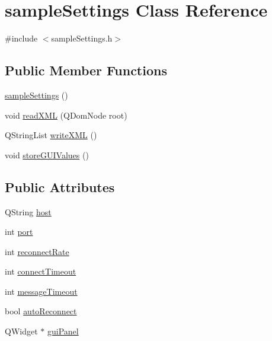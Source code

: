 \hypertarget{classsample_settings}{\section{sample\+Settings Class Reference}
\label{classsample_settings}
}


{\ttfamily \#include $<$sample\+Settings.\+h$>$}

\subsection*{Public Member Functions}
\begin{DoxyCompactItemize}
\item 
\hyperlink{classsample_settings_a3ae7a15cc1b8cf55d57139a0976f9dfd}{sample\+Settings} ()
\item 
void \hyperlink{classsample_settings_a2ab1eb40b65cddcad17c556f43fa2667}{read\+X\+M\+L} (Q\+Dom\+Node root)
\item 
Q\+String\+List \hyperlink{classsample_settings_a0996a76fb953ad9f5b7464cb328e60a4}{write\+X\+M\+L} ()
\item 
void \hyperlink{classsample_settings_ae87dbb0454d5dd59ba666fecf149cac7}{store\+G\+U\+I\+Values} ()
\end{DoxyCompactItemize}
\subsection*{Public Attributes}
\begin{DoxyCompactItemize}
\item 
Q\+String \hyperlink{classsample_settings_a1936cbf3ca632352dc75c1ecc30d9ec4}{host}
\item 
int \hyperlink{classsample_settings_a174a34a6ac173e8ded1b1496526a207e}{port}
\item 
int \hyperlink{classsample_settings_aa10ab5fff05664b7249873cea20c8164}{reconnect\+Rate}
\item 
int \hyperlink{classsample_settings_a4ea02c94b4f50acfefc8d9d8bea23868}{connect\+Timeout}
\item 
int \hyperlink{classsample_settings_a6fbeef484a848dc677b7e6d4f1526cbc}{message\+Timeout}
\item 
bool \hyperlink{classsample_settings_a4660e80373002545aa3ac363b47e709a}{auto\+Reconnect}
\item 
Q\+Widget $\ast$ \hyperlink{classsample_settings_a82b13a40ed430cce65c6e709858b792a}{gui\+Panel}
\end{DoxyCompactItemize}


